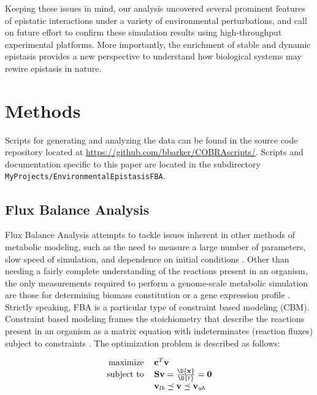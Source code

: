 Keeping these issues in mind, our analysis uncovered several prominent
features of epistatic interactions under a variety of environmental
perturbations, and call on future effort to confirm these simulation
results using high-throughput experimental platforms. More
importantly, the enrichment of stable and dynamic epistasis provides a
new perspective to understand how biological systems may rewire
epistasis in nature.

\section{Methods}

Scripts for generating and analyzing the data can be found in the
source code repository located at
\url{https://github.com/bbarker/COBRAscripts/}. Scripts and
documentation specific to this paper are located in the subdirectory
\texttt{MyProjects/EnvironmentalEpistasisFBA}.

\subsection{Flux Balance Analysis}

Flux Balance Analysis attempts to tackle issues inherent in other
methods of metabolic modeling, such as the need to measure a large
number of parameters, slow speed of simulation, and dependence on
initial conditions \citep{Orth2010, Schellenberger2011a}. 
Other than needing a fairly complete
understanding of the reactions present in an organism, the only
measurements required to perform a genome-scale metabolic simulation
are those for determining biomass constitution or a gene expression
profile \citep{Shlomi2005, Mo2009}. Strictly speaking, FBA is a particular type of
constraint based modeling (CBM). Constraint based modeling frames the
stoichiometry that describe the reactions present in an organism as a
matrix equation with indeterminates (reaction fluxes) subject to
constraints \citep{Smallbone2009a, Mo2009}. The optimization problem
is described as follows:


\begin{equation}
\centering
\begin{tabular}{rl}
maximize   & $\mathbf{c}^T\mathbf{v}$                                     \\
subject to & $\mathbf{S v} = \frac{\D{\mathbf{x}}}{\D{t}} = \mathbf{0}$   \\
           & $\mathbf{v}_{lb} \preceq \mathbf{v} \preceq \mathbf{v}_{ub}$ \\
\end{tabular}
\end{equation}

